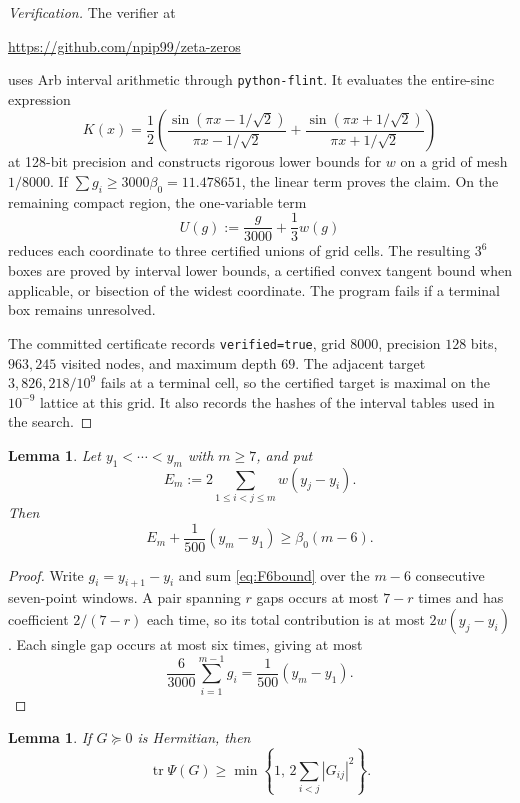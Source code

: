 \documentclass[11pt]{article}
\newtheorem{lemma}[theorem]{Lemma}
\DeclareMathOperator{\tr}{tr}
\begin{document}
\begin{proof}[Verification]
The verifier at
\begin{center}
 \url{https://github.com/npip99/zeta-zeros}
\end{center}
uses Arb interval arithmetic through \texttt{python-flint}.  It evaluates
the entire-sinc expression
\[
 K(x)=\frac12\left(
 \frac{\sin(\pi x-1/\sqrt2)}{\pi x-1/\sqrt2}
 +\frac{\sin(\pi x+1/\sqrt2)}{\pi x+1/\sqrt2}
 \right)
\]
at 128-bit precision and constructs rigorous lower bounds for $w$ on a grid
of mesh $1/8000$.  If $\sum g_i\ge3000\beta_0=11.478651$, the linear term
proves the claim.
On the remaining compact region, the one-variable term
\[
 U(g):=\frac g{3000}+\frac13w(g)
\]
reduces each coordinate to three certified unions of grid cells.  The
resulting $3^6$ boxes are proved by interval lower bounds, a certified convex
tangent bound when applicable, or bisection of the widest coordinate.  The
program fails if a terminal box remains unresolved.

The committed certificate records \texttt{verified=true}, grid $8000$,
precision $128$ bits, $963{,}245$ visited nodes, and maximum depth $69$.
The adjacent target $3{,}826{,}218/10^{9}$ fails at a terminal cell, so the
certified target is maximal on the $10^{-9}$ lattice at this grid.
It also records the hashes of the interval tables used in the search.
\end{proof}

\begin{lemma}\label{lem:block-energy}
Let $y_1<\cdots<y_m$ with $m\ge7$, and put
\[
 E_m:=2\sum_{1\le i<j\le m}w(y_j-y_i).
\]
Then
\begin{equation}\label{eq:block-energy}
 E_m+\frac1{500}(y_m-y_1)
 \ge\beta_0(m-6).
\end{equation}
\end{lemma}

\begin{proof}
Write $g_i=y_{i+1}-y_i$ and sum \eqref{eq:F6bound} over the $m-6$
consecutive seven-point windows.  A pair spanning $r$ gaps occurs at most
$7-r$ times and has coefficient $2/(7-r)$ each time, so its total
contribution is at most $2w(y_j-y_i)$.  Each single gap occurs at most six
times, giving at most
\[
 \frac6{3000}\sum_{i=1}^{m-1}g_i
 =\frac1{500}(y_m-y_1).
\]
\end{proof}

\begin{lemma}\label{lem:block-defect}
If $G\succeq0$ is Hermitian, then
\begin{equation}\label{eq:block-defect}
 \tr\Psi(G)
 \ge\min\left\{1,\,2\sum_{i<j}|G_{ij}|^2\right\}.
\end{equation}
\end{lemma}
\end{document}
